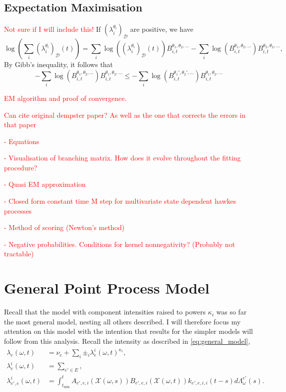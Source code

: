 \documentclass[honours,12pt]{unswthesis}
\numberwithin{equation}{section}
\begin{document}
\subsection{Expectation Maximisation}
\textcolor{red}{Not sure if I will include this!}
If $\left(\lambda_i^{\theta_i}\right)_\mathcal{D}$ are positive, we have
$$\log\left(\sum_i \left(\lambda_i^{\theta_i}\right)_{\mathcal{D}}(t)\right) = \sum_i \log\left(\left(\lambda_i^{\theta_i}\right)_\mathcal{D}(t)\right)B_{i,t}^{\theta_1,\theta_2,\ldots} - \sum_i \log\left( B_{i,t}^{\theta_1,\theta_2,\ldots}\right)B_{i,t}^{\theta_2,\theta_2,\ldots},$$
By Gibb's inequality, it follows that
$$- \sum_i \log\left( B_{i,t}^{\theta_1,\theta_2,\ldots}\right)B_{i,t}^{\theta_1,\theta_2,\ldots} \leq - \sum_i \log\left( B_{i,t}^{\theta_1',\theta_2',\ldots}\right)B_{i,t}^{\theta_1,\theta_2,\ldots} $$

\textcolor{red}{EM algorithm and proof of convergence.}

\textcolor{red}{Can cite original dempster paper? As well as the one that corrects the errors in that paper}

\textcolor{red}{- Equations

- Visualisation of branching matrix. How does it evolve throughout the fitting procedure?

- Quasi EM approximation

- Closed form constant time M step for multivariate state dependent hawkes processes

- Method of scoring (Newton's method)

- Negative probabilities. Conditions for kernel nonnegativity? (Probably not tractable) }

\section{General Point Process Model}
Recall that the model with component intensities raised to powers $\kappa_i$ was so far the most general model, nesting all others described. I will therefore focus my attention on this model with the intention that results for the simpler models will follow from this analysis. Recall the intensity as described in \eqref{eq:general_model},
\begin{equation*}
	\begin{align}
		\lambda_e(\omega,t) &= \nu_e + \sum_i \pm_i \lambda_e^i(\omega,t)^{\kappa_i}, \\
		\lambda_e^i(\omega,t) &= \sum_{e'\in E}, \\
		\lambda_{e',e}^i(\omega,t) &= \int_{t_\mathrm{min}}^t A_{e',e,i}(\mathcal{X}(\omega,s))B_{e',e,i}(\mathcal{X}(\omega,t))k_{e',e,i,i}(t-s)d\Lambda_\omega^{e'}(s).
	\end{align}
\end{equation*}
\end{document}
